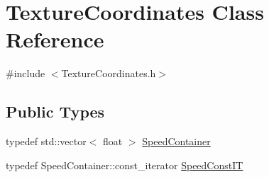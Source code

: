 \hypertarget{classTextureCoordinates}{}\section{Texture\+Coordinates Class Reference}
\label{classTextureCoordinates}


{\ttfamily \#include $<$Texture\+Coordinates.\+h$>$}

\subsection*{Public Types}
\begin{DoxyCompactItemize}
\item 
typedef std\+::vector$<$ float $>$ \hyperlink{classTextureCoordinates_adc1028525067f031d0b01f61d5e54ac9}{Speed\+Container}
\item 
typedef Speed\+Container\+::const\+\_\+iterator \hyperlink{classTextureCoordinates_a022fb09db1f7272f8d2ab3ba9396bc3b}{Speed\+Const\+IT}
\end{DoxyCompactItemize}
